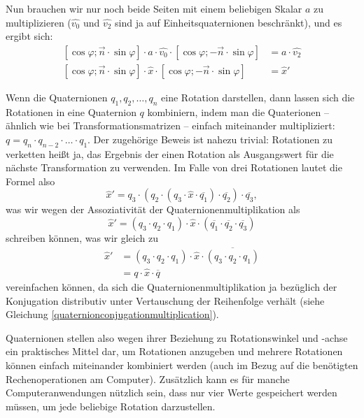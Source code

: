 Nun brauchen wir nur noch beide Seiten mit einem beliebigen Skalar $a$ zu multiplizieren ($\hat{v_0}$ und $\hat{v_2}$ sind ja auf Einheitsquaternionen beschränkt), und es ergibt sich:
\begin{equation}
\begin{split}
 \left[ \cos \varphi; \vec n \cdot \sin \varphi \right] \cdot a \cdot \hat{v_0} \cdot \left[ \cos \varphi; -\vec n \cdot \sin \varphi \right] &= a \cdot \hat{v_2} \\
 \left[ \cos \varphi; \vec n \cdot \sin \varphi \right] \cdot \hat{x} \cdot \left[ \cos \varphi; -\vec n \cdot \sin \varphi \right] &= \hat{x}'
\end{split}
\end{equation}

Wenn die Quaternionen $q_1, q_2, \ldots, q_n$ eine Rotation darstellen, dann lassen sich die Rotationen in eine Quaternion $q$ kombiniern, indem man die Quaterionen -- ähnlich wie bei Transformationsmatrizen -- einfach miteinander multipliziert: $q = q_n \cdot q_{n-2} \cdot \ldots \cdot q_1$. Der zugehörige Beweis ist nahezu trivial: Rotationen zu verketten heißt ja, das Ergebnis der einen Rotation als Ausgangswert für die nächste Transformation zu verwenden. Im Falle von drei Rotationen lautet die Formel also
\begin{equation}
 \hat{x}' = q_3 \cdot ( q_2 \cdot ( q_3 \cdot \hat{x} \cdot \overline{q_1} ) \cdot \overline{q_2} ) \cdot \overline{q_3},
\end{equation}
was wir wegen der Assoziativität der Quaternionenmultiplikation als 
\begin{equation}
 \hat{x}' = ( q_3 \cdot q_2 \cdot q_1 ) \cdot \hat{x} \cdot ( \overline{q_1} \cdot \overline{q_2} \cdot \overline{q_3} )
\end{equation}
schreiben können, was wir gleich zu
\begin{equation}
\begin{split}
 \hat{x}' &= ( q_3 \cdot q_2 \cdot q_1 ) \cdot \hat{x} \cdot \overline{( q_3 \cdot q_2 \cdot q_1 )} \\
 &= q \cdot \hat{x} \cdot \overline{q}
\end{split}
\end{equation} 
vereinfachen können, da sich die Quaternionenmultiplikation ja bezüglich der Konjugation distributiv unter Vertauschung der Reihenfolge verhält (siehe Gleichung \ref{quaternionconjugationmultiplication}).

Quaternionen stellen also wegen ihrer Beziehung zu Rotationswinkel und -achse ein praktisches Mittel dar, um Rotationen anzugeben und mehrere Rotationen können einfach miteinander kombiniert werden (auch im Bezug auf die benötigten Rechenoperationen am Computer). Zusätzlich kann es für manche Computeranwendungen nützlich sein, dass nur vier Werte gespeichert werden müssen, um jede beliebige Rotation darzustellen. 

